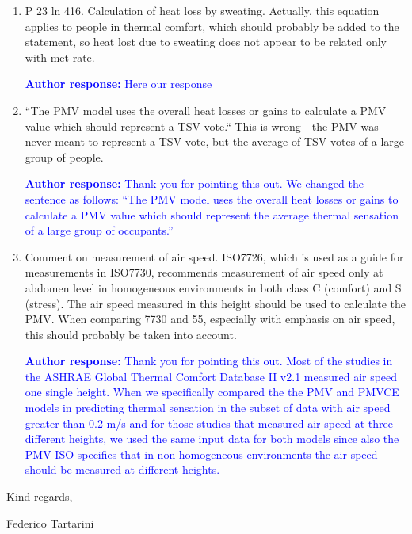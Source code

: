 \documentclass[a4paper, 10pt]{letter}
\newcommand{\response}[1]{\textcolor{blue}{\textbf{Author response:} #1}}
\begin{document}
\begin{letter}
\begin{enumerate}
            \response{
            We apologize for the confusion.
            We have revised the sentence to clarify this point.
            }

            \item P 23 ln 416.
            Calculation of heat loss by sweating.
            Actually, this equation applies to people in thermal comfort, which should probably be added to the statement, so heat lost due to sweating does not appear to be related only with met rate.

            \response{Here our response}

            \item ``The PMV model uses the overall heat losses or gains to calculate a PMV value which should represent a TSV vote.`` This is wrong - the PMV was never meant to represent a TSV vote, but the average of TSV votes of a large group of people.

            \response{
            Thank you for pointing this out.
            We changed the sentence as follows: ``The PMV model uses the overall heat losses or gains to calculate a PMV value which should represent the average thermal sensation of a large group of occupants.''
            }

            \item Comment on measurement of air speed.
            ISO7726, which is used as a guide for measurements in ISO7730, recommends measurement of air speed only at abdomen level in homogeneous environments in both class C (comfort) and S (stress).
            The air speed measured in this height should be used to calculate the PMV\@.
            When comparing 7730 and 55, especially with emphasis on air speed, this should probably be taken into account.

            \response{
            Thank you for pointing this out.
            Most of the studies in the ASHRAE Global Thermal Comfort Database II v2.1 measured air speed one single height.
            When we specifically compared the the PMV and PMVCE models in predicting thermal sensation in the subset of data with air speed greater than 0.2 m/s and for those studies that measured air speed at three different heights, we used the same input data for both models since also the PMV ISO specifies that in non homogeneous environments the air speed should be measured at different heights.
            }

        \end{enumerate}

        Kind regards,

        \vspace*{5px}

        Federico Tartarini

    \end{letter}
\end{document}
